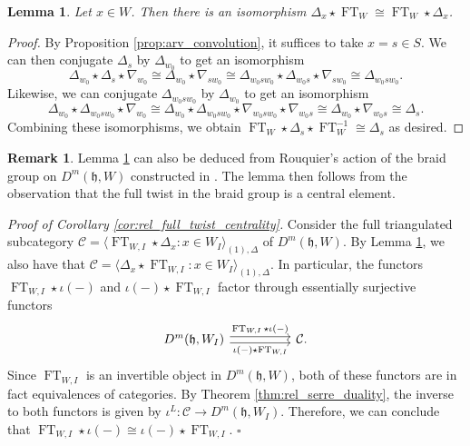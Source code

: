 \documentclass{amsart}
\newcommand{\scrC}{\mathcal{C}}
\newcommand{\BE}{D^m}
\newcommand{\fr}[1]{\mathfrak{#1}}
\newtheorem{lemma}{Lemma}[section]
\theoremstyle{definition}
\newtheorem{remark}{Remark}[section]
\newenvironment{midsecproof}[1]{\vspace{\topsep} \noindent \textit{Proof of #1.}}{\hfill$\square$}
\DeclareMathOperator{\FT}{FT}
\begin{document}
        \begin{lemma}\label{lem:ft_commutes}
                Let $x \in W$. Then there is an isomorphism $\Delta_x \star \FT_W \cong \FT_W \star \Delta_x$.
        \end{lemma}
        \begin{proof}
                By Proposition \ref{prop:arv_convolution}, it suffices to take $x = s \in S$. We can then conjugate $\Delta_s$ by $\Delta_{w_0}$ to get an isomorphism
                \[\Delta_{w_0} \star \Delta_s \star \nabla_{w_0} \cong \Delta_{w_0} \star \nabla_{sw_0} \cong \Delta_{w_0 s w_0} \star \Delta_{w_0 s} \star \nabla_{s w_0} \cong \Delta_{w_0 s w_0}. \]
                Likewise, we can conjugate $\Delta_{w_0 s w_0}$ by $\Delta_{w_0}$ to get an isomorphism
                \[\Delta_{w_0} \star \Delta_{w_0 s w_0} \star \nabla_{w_0} \cong \Delta_{w_0} \star \Delta_{w_0 s w_0} \star \nabla_{w_0 s w_0} \star \nabla_{w_0 s} \cong \Delta_{w_0} \star \nabla_{w_0 s} \cong \Delta_s.\]
                Combining these isomorphisms, we obtain $\FT_W \star \Delta_s \star \FT_W^{-1} \cong \Delta_s$ as desired. 
        \end{proof}

        \begin{remark}
                Lemma \ref{lem:ft_commutes} can also be deduced from Rouquier's action of the braid group on $\BE (\fr{h}, W)$ constructed in \cite{Rou}.
                The lemma then follows from the observation that the full twist in the braid group is a central element.
        \end{remark}

        \begin{midsecproof}{Corollary \ref{cor:rel_full_twist_centrality}}
                 Consider the full triangulated subcategory $\scrC = \langle \FT_{W, I} \star \Delta_x : x \in W_I \rangle_{(1), \Delta}$ of $\BE (\fr{h}, W)$. 
                By Lemma \ref{lem:ft_commutes}, we also have that $\scrC = \langle \Delta_x \star \FT_{W, I} : x \in W_I \rangle_{(1), \Delta}$. In particular, the functors $\FT_{W,I} \star \iota (-)$ and $\iota (-) \star \FT_{W,I}$ factor through essentially surjective functors
                \[\begin{tikzcd}
{\BE (\fr{h}, W_I)} \arrow[rr, "{\FT_{W,I} \star \iota (-)}", shift left] \arrow[rr, "{\iota (-) \star \FT_{W,I} }"', shift right] &  & \scrC.
\end{tikzcd}\]
Since $\FT_{W,I}$ is an invertible object in $\BE (\fr{h}, W)$, both of these functors are in fact equivalences of categories. 
By Theorem \ref{thm:rel_serre_duality}, the inverse to both functors is given by $\iota^L : \scrC \to \BE (\fr{h}, W_I)$.
Therefore, we can conclude that  $\FT_{W, I} \star \iota (-) \cong \iota (-) \star \FT_{W, I}$.
        \end{midsecproof}
\end{document}
